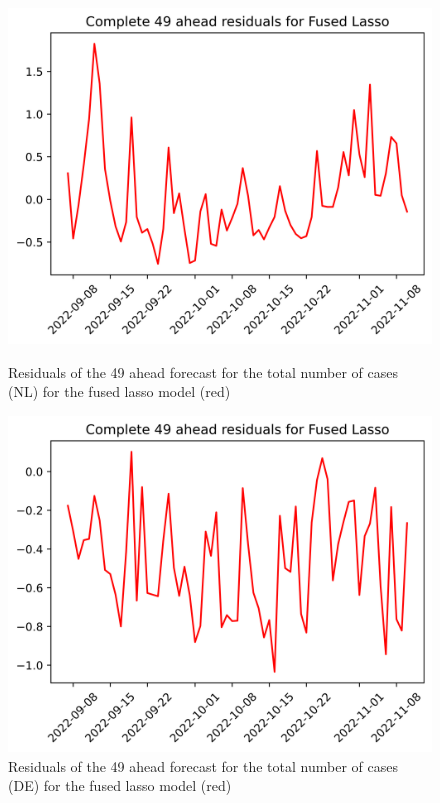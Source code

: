 \begin{figure}

\begin{minipage}{.45\textwidth}
  \centering
  \includegraphics[width=\linewidth]{pics/49_ah/49_ahead_errors_Fused Lasso.png}
  \caption{Residuals of the 49 ahead forecast for the total number of cases (NL) for the fused lasso model (red)}
  \label{fig:tot_cases_error_49_flasso}
\end{minipage}
\begin{minipage}{.45\textwidth}
  \centering
  \includegraphics[width=\linewidth]{pics/49_ah/DE_49_ahead_errors_Fused Lasso.png}
  \caption{Residuals of the 49 ahead forecast for the total number of cases (DE) for the fused lasso model (red)}
  \label{fig:tot_cases_error_49_flasso_DE}
\end{minipage}

\end{figure}
